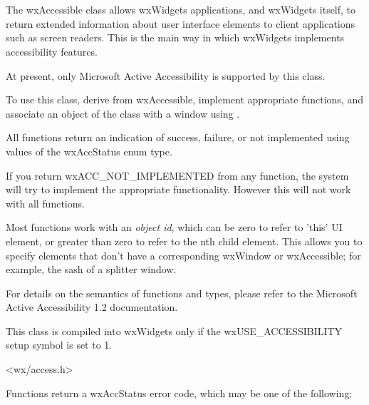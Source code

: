 %
%

\section{}\label{wxaccessible}

The wxAccessible class allows wxWidgets applications, and
wxWidgets itself, to return extended information about user interface elements
to client applications such as screen readers. This is the
main way in which wxWidgets implements accessibility features.

At present, only Microsoft Active Accessibility is supported
by this class.

To use this class, derive from wxAccessible, implement appropriate
functions, and associate an object of the class with a
window using .

All functions return an indication of success, failure, or not implemented
using values of the wxAccStatus enum type.

If you return wxACC\_NOT\_IMPLEMENTED from any function, the system will try to
implement the appropriate functionality. However this will not work with
all functions.

Most functions work with an {\it object id}, which can be zero to refer to
'this' UI element, or greater than zero to refer to the nth child element.
This allows you to specify elements that don't have a corresponding wxWindow or
wxAccessible; for example, the sash of a splitter window.

For details on the semantics of functions and types, please refer to the
Microsoft Active Accessibility 1.2 documentation.

This class is compiled into wxWidgets only if the wxUSE\_ACCESSIBILITY setup
symbol is set to 1.




<wx/access.h>




Functions return a wxAccStatus error code, which
may be one of the following:

